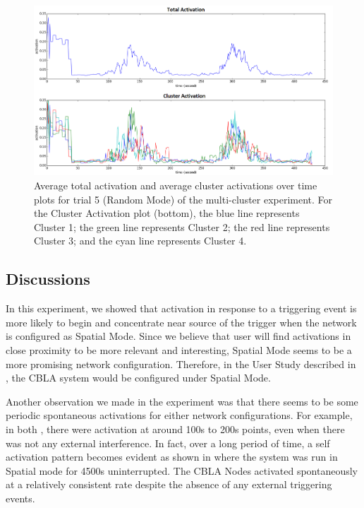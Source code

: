 \begin{figure} [!htb]
	\centering
	\includegraphics[width=1.0\textwidth]{"fig/validations/cbla_random_2015-11-16_15-14-04 - Metrics"}
	\caption[Average total activation and average cluster activations over time plots for trial 5 (Random Mode) of the multi-cluster experiment]{Average total activation and average cluster activations over time plots for trial 5 (Random Mode) of the multi-cluster experiment. For the Cluster Activation plot (bottom), the blue line represents Cluster 1; the green line represents Cluster 2; the red line represents Cluster 3; and the cyan line represents Cluster 4.}
	\label{fig:multi-cluster-results-random-2}
\end{figure}

\subsection{Discussions}

In this experiment, we showed that activation in response to a triggering event is more likely to begin and concentrate near source of the trigger when the network is configured as Spatial Mode. Since we believe that user will find activations in close proximity to be more relevant and interesting, Spatial Mode seems to be a more promising network configuration. Therefore, in the User Study described in , the CBLA system would be configured under Spatial Mode. 

Another observation we made in the experiment was that there seems to be some periodic spontaneous activations for either network configurations. For example, in both , there were activation at around 100s to 200s points, even when there was not any external interference. In fact, over a long period of time, a self activation pattern becomes evident as shown in  where the system was run in Spatial mode for 4500s uninterrupted. The CBLA Nodes activated spontaneously at a relatively consistent rate despite the absence of any external triggering events. 

